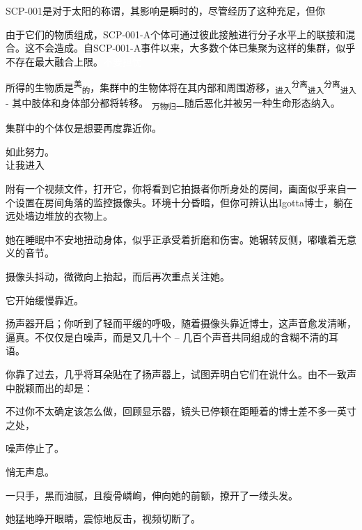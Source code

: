 SCP-001是对于太阳的称谓，其影响是瞬时的，尽管经历了这种充足，但你


由于它们的物质组成，SCP-001-A个体可通过彼此接触进行分子水平上的联接和混合。这不会造成。自SCP-001-A事件以来，大多数个体已集聚为这样的集群，似乎不存在最大融合上限。\textcolor{white}{不要担忧}

所得的生物质是\textsuperscript{美}\textsubscript{的}，集群中的生物体将在其内部和周围游移，\textsubscript{进入}\textsuperscript{分离}\textsubscript{进入}\textsuperscript{分离}\textsubscript{进入} - 其中肢体和身体部分都将转移。 \textsubscript{万物归一}随后恶化并被另一种生命形态纳入。

集群中的个体仅是想要再度靠近你。

如此努力。\\
\small{让我进入}


\begin{scpbox}

附有一个视频文件，打开它，你将看到它拍摄者你所身处的房间，画面似乎来自一个设置在房间角落的监控摄像头。环境十分昏暗，但你可辨认出Igotta博士，躺在远处墙边堆放的衣物上。

她在睡眠中不安地扭动身体，似乎正承受着折磨和伤害。她辗转反侧，嘟囔着无意义的音节。

摄像头抖动，微微向上抬起，而后再次重点关注她。

它开始缓慢靠近。

扬声器开启；你听到了轻而平缓的呼吸，随着摄像头靠近博士，这声音愈发清晰，逼真。不仅仅是白噪声，而是又几十个 – 几百个声音共同组成的含糊不清的耳语。

你靠了过去，几乎将耳朵贴在了扬声器上，试图弄明白它们在说什么。由不一致声中脱颖而出的却是：

\end{scpbox}


\begin{scpbox}

不过你不太确定该怎么做，回顾显示器，镜头已停顿在距睡着的博士差不多一英寸之处，

噪声停止了。

悄无声息。

一只手，黑而油腻，且瘦骨嶙峋，伸向她的前额，撩开了一缕头发。

她猛地睁开眼睛，震惊地反击，视频切断了。

\end{scpbox}

